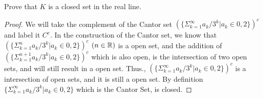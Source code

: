 \begin{majorEx}
Prove that $K$ is a closed set in the real line.
\end{majorEx}

\begin{proof}
We will take the complement of the Cantor set $(\{\Sigma_{k=1}^\infty a_k/3^k | a_k \in {0, 2}\})^c$ and label it $C^c$. In the construction of the
Cantor set, we know that $(\{\Sigma_{k=1}^n a_k/3^k | a_k \in {0, 2}\})^c$ $(n \in \mathbb{R})$ is a open set, and the addition of $(\{\Sigma_{k=1}^{n+1} a_k/3^k | a_k \in {0, 2}\})^c$ which is also open, is the intersection of two open sets, and will still result in a open set. Thus., $(\{\Sigma_{k=1}^\infty a_k/3^k | a_k \in {0, 2}\})^c$ is a intersection of open sets, and it is still a open set. By definition $\{\Sigma_{k=1}^\infty a_k/3^k | a_k \in {0, 2}\}$ which is the Cantor Set, is closed.
\end{proof}

